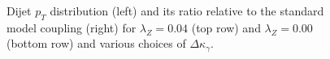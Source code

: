 \begin{figure}[h!t]
{    \caption{Dijet $p_T$ distribution (left) and its ratio relative to 
    the standard model coupling (right) for $\lambda_Z = 0.04$ (top row) and 
    $\lambda_Z = 0.00$ (bottom row)
    and various choices of $\Delta{\kappa_\gamma}$.}
    \label{fig:ww_dijetPt_atgcRatio004}}
\end{figure}
%
